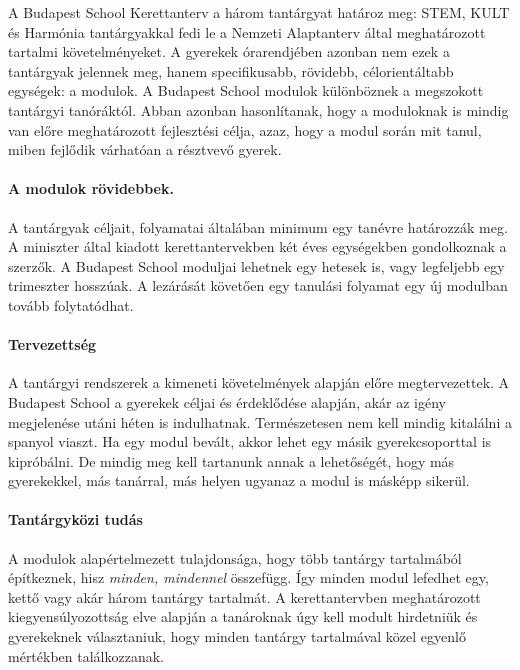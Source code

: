 A Budapest School Kerettanterv a három tantárgyat határoz meg: STEM,
KULT és Harmónia tantárgyakkal fedi le a Nemzeti Alaptanterv által
meghatározott tartalmi követelményeket. A gyerekek órarendjében azonban
nem ezek a tantárgyak jelennek meg, hanem specifikusabb, rövidebb,
célorientáltabb egységek: a modulok. A Budapest School modulok
különböznek a megszokott tantárgyi tanóráktól. Abban azonban
hasonlítanak, hogy a moduloknak is mindig van előre meghatározott
fejlesztési célja, azaz, hogy a modul során mit tanul, miben fejlődik
várhatóan a résztvevő gyerek.

\paragraph{A modulok rövidebbek.}

A tantárgyak céljait, folyamatai általában minimum egy tanévre
határozzák meg. A miniszter által kiadott kerettantervekben két éves
egységekben gondolkoznak a szerzők. A Budapest School moduljai lehetnek
egy hetesek is, vagy legfeljebb egy trimeszter hosszúak. A lezárását
követően egy tanulási folyamat egy új modulban tovább folytatódhat.

\paragraph{Tervezettség}\label{tervezettsuxe9g}

A tantárgyi rendszerek a kimeneti követelmények alapján előre
megtervezettek. A Budapest School a gyerekek céljai és érdeklődése
alapján, akár az igény megjelenése utáni héten is indulhatnak.
Természetesen nem kell mindig kitalálni a spanyol viaszt. Ha egy modul
bevált, akkor lehet egy másik gyerekcsoporttal is kipróbálni. De mindig
meg kell tartanunk annak a lehetőségét, hogy más gyerekekkel, más
tanárral, más helyen ugyanaz a modul is másképp sikerül.

\paragraph{Tantárgyközi tudás}\label{tantuxe1rgykuxf6zi-tuduxe1s}

A modulok alapértelmezett tulajdonsága, hogy több tantárgy tartalmából
építkeznek, hisz \emph{minden, mindennel} összefügg. Így minden modul
lefedhet egy, kettő vagy akár három tantárgy tartalmát. A
kerettantervben meghatározott kiegyensúlyozottság elve alapján a
tanároknak úgy kell modult hirdetniük és gyerekeknek választaniuk, hogy
minden tantárgy tartalmával közel egyenlő mértékben találkozzanak.

